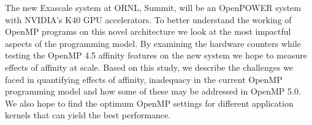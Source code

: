 The new Exascale system at ORNL, Summit, will be an OpenPOWER system with NVIDIA's K40 GPU accelerators. To better understand the working of OpenMP 
programs on this novel architecture we look at the most impactful aspects of the programming model. By examining the hardware counters while testing the OpenMP 4.5 affinity features on the new system we hope to measure effects of affinity at scale. Based on this study, we describe the challenges we faced in quantifying effects of affinity, inadequacy in the current OpenMP programming model and how some of these may be addressed in OpenMP 5.0. We also hope to find the optimum OpenMP settings for different application kernels that can yield the best performance.